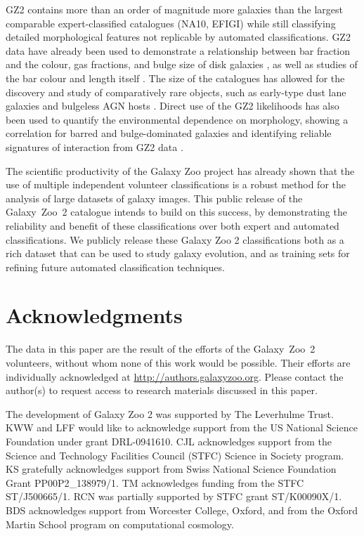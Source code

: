 \documentclass[useAMS,usenatbib]{mn2e}
\begin{document}
GZ2 contains more than an order of magnitude more galaxies than the largest comparable expert-classified catalogues (NA10, EFIGI) while still classifying detailed morphological features not replicable by automated classifications. GZ2 data have already been used to demonstrate a relationship between bar fraction and the colour, gas fractions, and bulge size of disk galaxies \citep{mas11c,mas12a}, as well as studies of the bar colour and length itself \citep{hoy11}. The size of the catalogues has allowed for the discovery and study of comparatively rare objects, such as early-type dust lane galaxies \citep{kav12a} and bulgeless AGN hosts \citep{sim13}. Direct use of the GZ2 likelihoods has also been used to quantify the environmental dependence on morphology, showing a correlation for barred and bulge-dominated galaxies \citep{ski12} and identifying reliable signatures of interaction from GZ2 data \citep{cas13}. 

The scientific productivity of the Galaxy Zoo project has already shown that the use of multiple independent volunteer classifications is a robust method for the analysis of large datasets of galaxy images. This public release of the Galaxy~Zoo~2 catalogue intends to build on this success, by demonstrating the reliability and benefit of these classifications over both expert and automated classifications. We publicly release these Galaxy Zoo 2 classifications both as a rich dataset that can be used to study galaxy evolution, and as training sets for refining future automated classification techniques.


\section*{Acknowledgments}
The data in this paper are the result of the efforts of the Galaxy~Zoo~2 volunteers, without whom none of this work would be possible. Their efforts are individually acknowledged at \url{http://authors.galaxyzoo.org}. Please contact the author(s) to request access to research materials discussed in this paper. 

The development of Galaxy Zoo 2 was supported by The Leverhulme Trust. KWW and LFF would like to acknowledge support from the US National Science Foundation under grant DRL-0941610. CJL acknowledges support from the Science and Technology Facilities Council (STFC) Science in Society program. KS gratefully acknowledges support from Swiss National Science Foundation Grant PP00P2\_138979/1. TM acknowledges funding from the STFC ST/J500665/1. RCN was partially supported by STFC grant ST/K00090X/1. BDS acknowledges support from Worcester College, Oxford, and from the Oxford Martin School program on computational cosmology.
\end{document}
